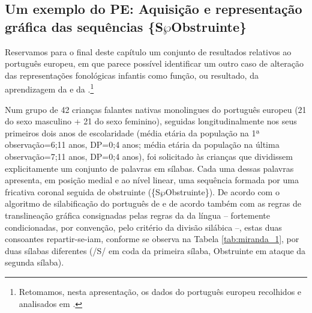\documentclass[output=paper]{LSP/langsci}
\begin{document}
\subsection{Um exemplo do PE: Aquisição e representação gráfica das sequências \{S$\wp$Obstruinte\}}

Reservamos para o final deste capítulo um conjunto de resultados relativos ao português europeu, em que parece possível identificar um outro caso de alteração das representações fonológicas infantis como função, ou resultado, da aprendizagem da  e da .\footnote{Retomamos, nesta apresentação, os dados do português europeu recolhidos e analisados em \citet{veloso2007}.}

Num grupo de 42 crianças falantes nativas monolingues do português europeu (21 do sexo masculino + 21 do sexo feminino), seguidas longitudinalmente nos seus primeiros dois anos de escolaridade (média etária da população na 1ª observação=6;11 anos, DP=0;4 anos; média etária da população na última observação=7;11 anos, DP=0;4 anos), foi solicitado às crianças que dividissem explicitamente um conjunto de palavras em sílabas. Cada uma dessas palavras apresenta, em posição medial e ao nível linear, uma sequência formada por uma fricativa coronal seguida de obstruinte (\{S$\wp$Obstruinte\}). De acordo com o algoritmo de silabificação do português de \citet{mateusdandrade2000} e de acordo também com as regras de translineação gráfica consignadas pelas regras da  da língua -- fortemente condicionadas, por convenção, pelo critério da divisão silábica --, estas duas consoantes repartir-se-iam, conforme se observa na Tabela \ref{tab:miranda_1}, por duas sílabas diferentes (/S/ em coda da primeira sílaba, Obstruinte em ataque da segunda sílaba).

\begin{table}[h]
\caption{Palavras utilizadas no teste de divisão silábica}
\label{tab:miranda_1}
\end{table}
\end{document}
